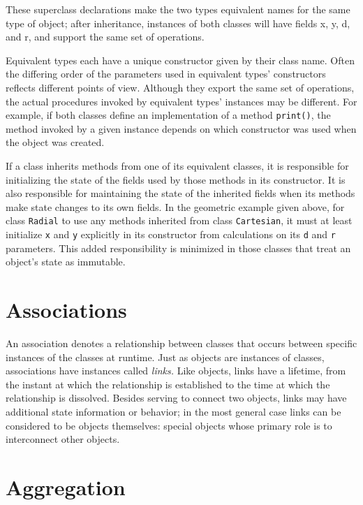These superclass declarations make the two types equivalent names for
the same type of object; after inheritance,
instances of both classes will
have fields x, y, d, and r, and support the same set of operations. 

Equivalent types each have a unique constructor
given by their class name. Often the differing order of the parameters
used in equivalent types' constructors reflects
different points of view. Although they export the same set of
operations, the actual procedures invoked by equivalent
types' instances may be different. For example, if
both classes define an implementation of a method \texttt{print()}, the
method invoked by a given instance depends on which constructor was
used when the object was created.

If a class inherits methods from one of its equivalent classes, it
is responsible for initializing the state of the fields used by
those methods in its constructor. It is also responsible for
maintaining the state of the inherited fields when its methods make
state changes to its own fields. In the geometric example given above,
for class \texttt{Radial} to use any methods inherited from class
\texttt{Cartesian}, it must at least initialize \texttt{x} and
\texttt{y} explicitly in its constructor from calculations on its
\texttt{d} and \texttt{r} parameters. This added
responsibility is minimized in those classes that treat an
object's state as immutable.

\section{Associations}

An association denotes a relationship between classes
that occurs between specific instances of the classes at runtime.
Just as objects are instances of classes, associations
have instances called \textit{links.}
Like objects, links have a lifetime, from the instant
at which the relationship is established to the time at which the
relationship is dissolved. Besides serving to connect two objects,
links may have additional state information or behavior; in the most
general case links can be considered to be objects themselves: special
objects whose primary role is to interconnect other objects.

\section{Aggregation}

